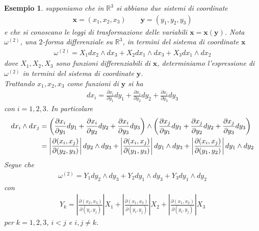 \documentclass[twoside, 11pt]{amsbook}
\newcommand{\0}{{(0)}}
\newcommand{\3}{{(3)}}
\theoremstyle{colonplain}
\theoremstyle{colondefinition}
\newtheorem{ex}[thm]{Esempio}
\theoremstyle{colonremark}
\numberwithin{equation}{chapter}
\begin{document}
\begin{ex} supponiamo che in $\mathbb{R}^3$ si abbiano due sistemi di coordinate
\begin{align}
   \mathbf{x} = (x_1, x_2, x_3) \qquad \mathbf{y} = (y_1, y_2, y_3) 
\end{align}
e che si conoscano le leggi di trasformazione delle variabili $\mathbf{x} = \mathbf{x}(\mathbf{y})$. Nota $\omega^{(2)}$, una $2$-forma differenziale su $\mathbb{R}^3$, in termini del sistema di coordinate $\mathbf{x}$
\begin{align}
   \omega^{(2)} = X_1dx_2 \wedge dx_3 + X_2dx_1 \wedge dx_3 + X_3dx_1 \wedge dx_2 
\end{align}
dove $X_1, X_2, X_3$ sono funzioni differenziabili di $\mathbf{x}$, determiniamo l'espressione di $\omega^{(2)}$ in termini del sistema di coordinate $\mathbf{y}$. \\
Trattando $x_1, x_2, x_3$ come funzioni di $\mathbf{y}$ si ha
\begin{align}
   dx_i = \frac{\partial x_i}{\partial y_1}dy_1 + \frac{\partial x_i}{\partial y_2}dy_2 + \frac{\partial x_i}{\partial y_3}dy_3 
\end{align}
con $i = 1, 2, 3$. In particolare
\begin{align}
   dx_i \wedge dx_j &= \left(\frac{\partial x_i}{\partial y_1}dy_1 + \frac{\partial x_i}{\partial y_2}dy_2 + \frac{\partial x_i}{\partial y_3}dy_3\right) \wedge \left(\frac{\partial x_j}{\partial y_1}dy_1 + \frac{\partial x_j}{\partial y_2}dy_2 + \frac{\partial x_j}{\partial y_3}dy_3\right) \notag \\
   &= \left|\frac{\partial(x_i, x_j)}{\partial(y_2, y_3)}\right|dy_2 \wedge dy_3 + \left|\frac{\partial(x_i, x_j)}{\partial(y_1, y_3)}\right|dy_1 \wedge dy_3 + \left|\frac{\partial(x_i, x_j)}{\partial(y_1, y_2)}\right|dy_1 \wedge dy_2 
\end{align}
Segue che 
\begin{align}
   \omega^{(2)} = Y_1dy_2 \wedge dy_3 + Y_2dy_1 \wedge dy_3 + Y_3dy_1 \wedge dy_2 
\end{align}
con
\begin{align}
   Y_k = \left|\frac{\partial(x_2, x_3)}{\partial(y_i, y_j)}\right|X_1 + \left|\frac{\partial(x_1, x_3)}{\partial(y_i, y_j)}\right|X_2 + \left|\frac{\partial(x_1, x_2)}{\partial(y_i, y_j)}\right|X_3 
\end{align}
per $k = 1, 2, 3$, $i < j$ e $i, j \neq k$.
\end{ex}
\end{document}
